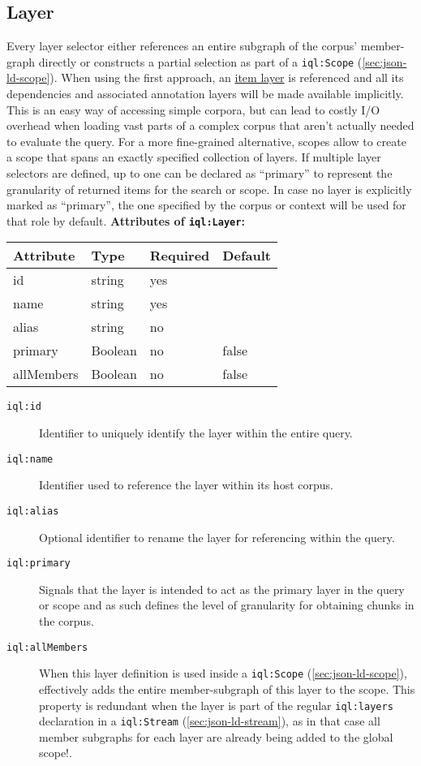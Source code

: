 \documentclass[11pt]{article}
\newcommand{\iqlns}{iql:}
\newcommand{\repoUrl}{https://github.com/ICARUS-tooling/icarus2-modeling-framework/blob/dev/}
\newcommand{\modelsUrl}{\repoUrl icarus2-model-api/src/main/java/de/ims/icarus2/model/api/}
\newcommand{\repoLink}[2]{\href{#1}{#2}}
\newcommand{\iqlType}[1]{\texttt{\iqlns#1}}
\newcommand{\desc}[1]{\noindent#1\newline\medskip}
\newenvironment{attributes}[1]{
\noindent\textbf{Attributes of #1:}\newline\medskip
\begin{tabular}{|p{0.3\textwidth}|p{0.20\textwidth}|p{0.20\textwidth}|p{0.17\textwidth}|}
	\hline
	\textbf{Attribute} & \textbf{Type} & \textbf{Required} & \textbf{Default} \\ 
	\hline
	\hline
}{
\end{tabular}
}
\newcommand{\attribute}[4]{
	#1 & #2 & #3 & #4 \\
	\hline
}
\begin{document}
\subsection{Layer}
\label{sec:json-ld-layer}
\desc{Every layer selector either references an entire subgraph of the corpus' member-graph directly or constructs a partial selection as part of a \iqlType{Scope} (\ref{sec:json-ld-scope}). 
When using the first approach, an \repoLink{\modelsUrl layer/ItemLayer.java}{item layer} is referenced and all its dependencies and associated annotation layers will be made available implicitly. 
This is an easy way of accessing simple corpora, but can lead to costly I/O overhead when loading vast parts of a complex corpus that aren't actually needed to evaluate the query. 
For a more fine-grained alternative, scopes allow to create a scope that spans an exactly specified collection of layers. 
If multiple layer selectors are defined, up to one can be declared as ``primary'' to represent the granularity of returned items for the search or scope.
In case no layer is explicitly marked as ``primary'', the one specified by the corpus or context will be used for that role by default.}
\begin{attributes}{\iqlType{Layer}}
	\attribute{id}{string}{yes}{}
	\attribute{name}{string}{yes}{}
	\attribute{alias}{string}{no}{}
	\attribute{primary}{Boolean}{no}{false}
	\attribute{allMembers}{Boolean}{no}{false}
\end{attributes}
\begin{description}
	\item[\iqlType{id}] Identifier to uniquely identify the layer within the entire query.
	\item[\iqlType{name}] Identifier used to reference the layer within its host corpus.
	\item[\iqlType{alias}] Optional identifier to rename the layer for referencing within the query.
	\item[\iqlType{primary}] Signals that the layer is intended to act as the primary layer in the query or scope and as such defines the level of granularity for obtaining chunks in the corpus.
	\item[\iqlType{allMembers}] When this layer definition is used inside a \iqlType{Scope} (\ref{sec:json-ld-scope}), effectively adds the entire member-subgraph of this layer to the scope. This property is redundant when the layer is part of the regular \iqlType{layers} declaration in a \iqlType{Stream} (\ref{sec:json-ld-stream}), as in that case all member subgraphs for each layer are already being added to the global scope!.
\end{description}
\end{document}
